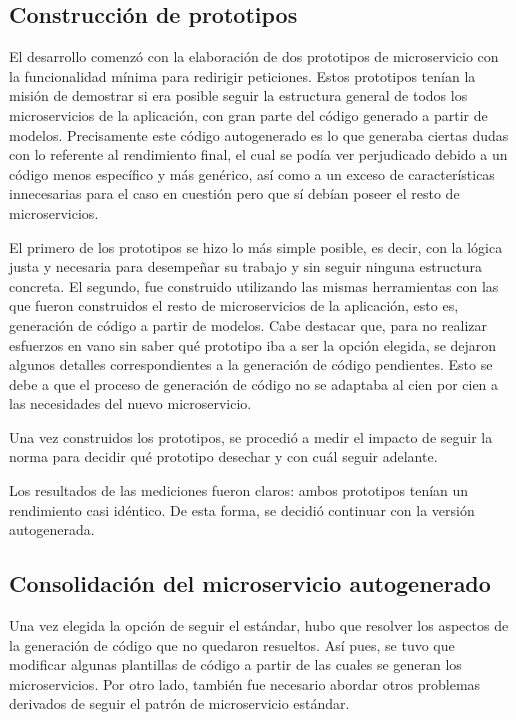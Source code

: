 \documentclass[11pt,spanish,listoffigures]{tfgetsinf}
\begin{document}
		\subsection{Construcción de prototipos}

El desarrollo comenzó con la elaboración de dos prototipos de microservicio con la funcionalidad mínima para redirigir peticiones. Estos prototipos tenían la misión de demostrar si era posible seguir la estructura general de todos los microservicios de la aplicación, con gran parte del código generado a partir de modelos. Precisamente este código autogenerado es lo que generaba ciertas dudas con lo referente al rendimiento final, el cual se podía ver perjudicado debido a un código menos específico y más genérico, así como a un exceso de características innecesarias para el caso en cuestión pero que sí debían poseer el resto de microservicios.

El primero de los prototipos se hizo lo más simple posible, es decir, con la lógica justa y necesaria para desempeñar su trabajo y sin seguir ninguna estructura concreta. El segundo, fue construido utilizando las mismas herramientas con las que fueron construidos el resto de microservicios de la aplicación, esto es, generación de código a partir de modelos. Cabe destacar que, para no realizar esfuerzos en vano sin saber qué prototipo iba a ser la opción elegida, se dejaron algunos detalles correspondientes a la generación de código pendientes. Esto se debe a que el proceso de generación de código no se adaptaba al cien por cien a las necesidades del nuevo microservicio.

Una vez construidos los prototipos, se procedió a medir el impacto de seguir la norma para decidir qué prototipo desechar y con cuál seguir adelante.

Los resultados de las mediciones fueron claros: ambos prototipos tenían un rendimiento casi idéntico. De esta forma, se decidió continuar con la versión autogenerada.


		\subsection{Consolidación del microservicio autogenerado}

Una vez elegida la opción de seguir el estándar, hubo que resolver los aspectos de la generación de código que no quedaron resueltos. Así pues, se tuvo que modificar algunas plantillas de código a partir de las cuales se generan los microservicios. Por otro lado, también fue necesario abordar otros problemas derivados de seguir el patrón de microservicio estándar.
\end{document}
